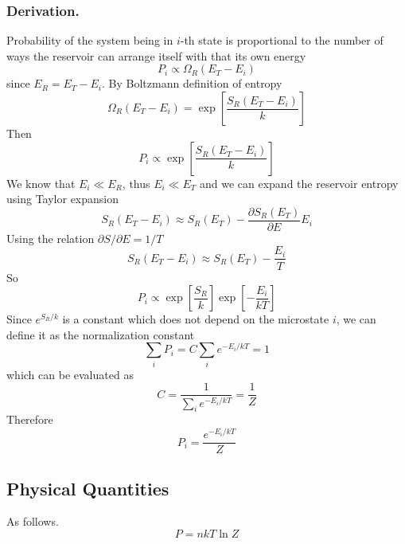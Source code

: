 \documentclass[../../../Main.tex]{subfiles}
\begin{document}
\subsubsection*{Derivation.} Probability of the system being in $i$-th state is proportional to the number of ways the reservoir can arrange itself with that its own energy
\begin{equation*}
    P_i\propto \Omega_R(E_T-E_i)
\end{equation*}
since $E_R=E_T-E_i$. By Boltzmann definition of entropy
\begin{equation*}
    \Omega_R(E_T-E_i)=\exp\left[\frac{S_R(E_T-E_i)}{k }\right]
\end{equation*}
Then 
\begin{equation*}
    P_i\propto \exp\left[\frac{S_R(E_T-E_i)}{k }\right]
\end{equation*}
We know that $E_i\ll E_R$, thus $E_i\ll E_T$ and we can expand the reservoir entropy using Taylor expansion
\begin{equation*}
    S_R(E_T-E_i)\approx S_R(E_T)-\frac{\partial S_R(E_T)}{\partial E}E_i
\end{equation*}
Using the relation $\partial S/\partial E=1/T$
\begin{equation*}
    S_R(E_T-E_i)\approx S_R(E_T)-\frac{E_i}{T}
\end{equation*}
So 
\begin{equation*}
    P_i\propto\exp\left[\frac{S_R}{k }\right]\exp\left[-\frac{E_i}{kT}\right]
\end{equation*}
Since $e^{S_R/k}$ is a constant which does not depend on the microstate $i$, we can define it as the normalization constant
\begin{equation*}
    \sum_i P_i=C\sum_i e^{-E_i/kT}=1
\end{equation*}
which can be evaluated as 
\begin{equation*}
    C=\frac{1}{\sum_i e^{-E_i/kT}}=\frac{1}{Z}
\end{equation*}
Therefore
\begin{equation*}
    P_i=\frac{ e^{-E_i/kT}}{Z}
\end{equation*}

\subsection*{Physical Quantities}
As follows.
\begin{equation*}
    P=nkT\ln Z
\end{equation*}
\end{document}

